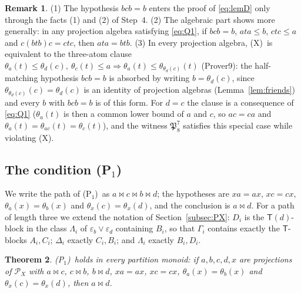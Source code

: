 \documentclass[11pt]{amsart}
\newtheorem{theorem}{Theorem}[section]
\theoremstyle{definition}
\newtheorem{remark}[theorem]{Remark}
\renewcommand{\P}{\mathcal{P}}      %
\newcommand{\T}{\mathsf{T}}
\newcommand{\mt}{\bowtie}      %
\newcommand{\Vcond}{\textup{(X)}}      %
\newcommand{\Pone}{\textup{(P$_1$)}}
\begin{document}
\begin{remark}\label{rem:V}
(1) The hypothesis $bcb=b$ enters the proof of \eqref{eq:lemD} only through the facts (1) and (2) of Step~4. (2) The algebraic part shows more generally: in any projection algebra satisfying \eqref{eq:Q1}, if $bcb=b$, $ata\le b$, $ctc\le a$ and $c(btb)c=ctc$, then $ata=btb$. (3) In every projection algebra, \Vcond\ is equivalent to the three-atom clause $\theta_a(t)\le\theta_d(c),\ \theta_c(t)\le a\Rightarrow\theta_a(t)\le\theta_{\theta_d(c)}(t)$ (Prover9): the half-matching hypothesis $bcb=b$ is absorbed by writing $b=\theta_d(c)$, since $\theta_{\theta_d(c)}(c)=\theta_d(c)$ is an identity of projection algebras (Lemma~\ref{lem:friends}) and every $b$ with $bcb=b$ is of this form. For $d=c$ the clause is a consequence of \eqref{eq:Q1} ($\theta_a(t)$ is then a common lower bound of $a$ and $c$, so $ac=ca$ and $\theta_a(t)=\theta_{ac}(t)=\theta_c(t)$), and the witness $\mathfrak P_8^7$ satisfies this special case while violating \Vcond.
\end{remark}

\subsection{The condition \Pone}\label{subsec:P1}

We write the path of \Pone\ as $a\mt c\mt b\mt d$; the hypotheses are $xa=ax$, $xc=cx$, $\theta_a(x)=\theta_b(x)$ and $\theta_x(c)=\theta_x(d)$, and the conclusion is $a\mt d$. For a path of length three we extend the notation of Section~\ref{subsec:PX}: $D_i$ is the $\T(d)$-block in the class $\Lambda_i$ of $\varepsilon_b\vee\varepsilon_d$ containing $B_i$, so that $\Gamma_i$ contains exactly the $\T$-blocks $A_i,C_i$; $\Delta_i$ exactly $C_i,B_i$; and $\Lambda_i$ exactly $B_i,D_i$.

\begin{theorem}\label{thm:P1}
\Pone\ holds in every partition monoid: if $a,b,c,d,x$ are projections of $\P_X$ with $a\mt c$, $c\mt b$, $b\mt d$, $xa=ax$, $xc=cx$, $\theta_a(x)=\theta_b(x)$ and $\theta_x(c)=\theta_x(d)$, then $a\mt d$.
\end{theorem}
\end{document}

